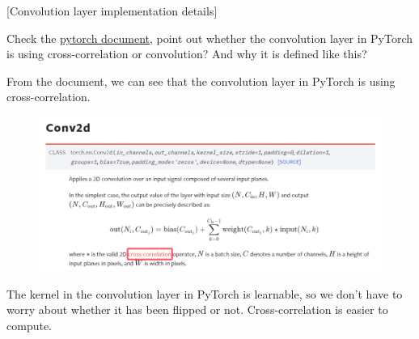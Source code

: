 \item {} [Convolution layer implementation details]

Check the \href{https://pytorch.org/docs/stable/generated/torch.nn.Conv2d.html#torch.nn.Conv2d}{pytorch document}, point out whether the convolution layer in PyTorch is using cross-correlation or convolution? And why it is defined like this? 

\solution

From the document, we can see that the convolution layer in PyTorch is using cross-correlation.
\begin{figure}[h]
    \centering
    \includegraphics[width=\textwidth]{torch_conv.png}
\end{figure}

The kernel in the convolution layer in PyTorch is learnable, so we don't have to worry about whether it has been flipped or not. Cross-correlation is easier to compute.

\newpage